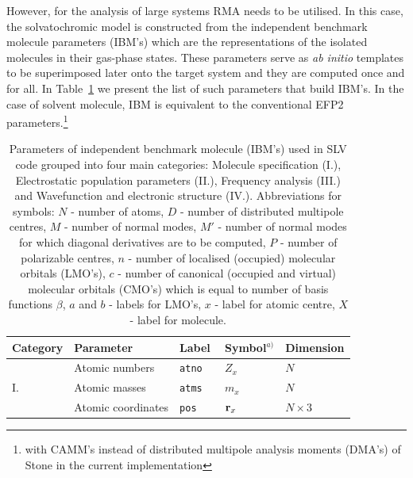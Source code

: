 \documentclass[a4paper,titlepage,twoside,fleqn,12pt]{book}
\begin{document}
\begin{refsection}
However, for the analysis of large systems RMA needs 
to be utilised. In this case, the solvatochromic model is constructed 
from the independent benchmark molecule parameters (IBM's)
which are the representations of the isolated molecules in their gas\hyp{}phase states.
These parameters serve as \emph{ab initio} templates to be superimposed later onto
the target system and they are computed once and for all.
In Table~\ref{t:slv-rma-parameters}
we present the list of such parameters that
build IBM's. In the case of solvent molecule,
IBM is equivalent to the conventional EFP2 parameters.\footnote{with 
CAMM's instead of distributed multipole analysis moments
(DMA's) of Stone \citep{Stone.JCTC.2005} in the current implementation}
%
\begin{table}[t!]
\caption{
 Parameters of independent benchmark molecule (IBM's) used in SLV code grouped
 into four main categories: Molecule specification (I.), Electrostatic population
 parameters (II.), Frequency analysis (III.) and Wavefunction and electronic structure (IV.).
 Abbreviations for symbols: $N$ - number of atoms, $D$ - number of distributed multipole centres,
 $M$ - number of normal modes, $M'$ - number of normal modes for which diagonal derivatives
 are to be computed, $P$ - number of polarizable centres, $n$ - number of localised (occupied) molecular
 orbitals (LMO's), $c$ - number of canonical (occupied and virtual) molecular orbitals (CMO's) which is equal to
 number of basis functions $\beta$, $a$ and $b$ - labels for LMO's, $x$ - label for atomic centre, 
 $X$ - label for molecule.
\label{t:slv-rma-parameters}}
\begin{tabular*}{1.0\textwidth}{@{\extracolsep{\fill} } lllll}
\hline\hline
 Category   & Parameter & Label & Symbol$^{a)}$ & Dimension \\
\hline
\multirow{3}{*}{I.}
&Atomic numbers                         &\tt{atno    } &   $Z_x$                                     &      $N$                                 \\                                        
&Atomic masses                          &\tt{atms    } &   $m_x$                                     &      $N$                                 \\
&Atomic coordinates                     &\tt{pos     } &   ${\bf r}_x$                               &      $N\times 3$                         \\

\end{tabular*}
\end{table}
\end{refsection}
\end{document}
